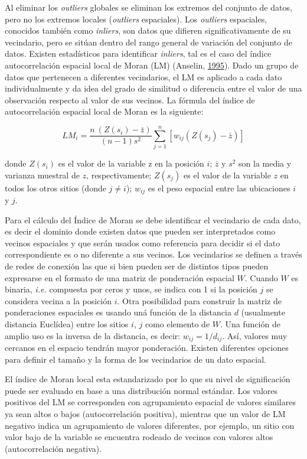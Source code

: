\documentclass[11pt,b5paper,]{krantz}
\begin{document}
Al eliminar los \emph{outliers} globales se eliminan los extremos del
conjunto de datos, pero no los extremos locales (\emph{outliers}
espaciales). Los \emph{outliers} espaciales, conocidos también como
\emph{inliers}, son datos que difieren significativamente de su
vecindario, pero se sitúan dentro del rango general de variación del
conjunto de datos. Existen estadísticos para identificar \emph{inliers},
tal es el caso del índice autocorrelación espacial local de Moran (LM)
(Anselin, \protect\hyperlink{ref-Anselin_1995}{1995}). Dado un grupo de
datos que pertenecen a diferentes vecindarios, el LM es aplicado a cada
dato individualmente y da idea del grado de similitud o diferencia entre
el valor de una observación respecto al valor de sus vecinos. La fórmula
del índice de autocorrelación espacial local de Moran es la siguiente:

\[{LM}_i=\frac{n\ (Z(s_i)-\bar{z})}{(n-1)s^2}\sum_{j=1}^{n}\left[w_{ij}\left(Z(s_j)-\bar{z}\right)\right]\]

donde \(Z(s_i)\) es el valor de la variable z en la posición \(i\);
\(\bar{z}\) y \(s^2\) son la media y varianza muestral de \(z\),
respectivamente; \(Z(s_j)\) es el valor de la variable \(z\) en todos
los otros sitios (donde \(j\neq i\)); \(w_{ij}\) es el peso espacial
entre las ubicaciones \(i\) y \(j\).

Para el cálculo del Índice de Moran se debe identificar el vecindario de
cada dato, es decir el dominio donde existen datos que pueden ser
interpretados como vecinos espaciales y que serán usados como referencia
para decidir si el dato correspondiente es o no diferente a sus vecinos.
Los vecindarios se definen a través de redes de conexión las que si bien
pueden ser de distintos tipos pueden expresarse en el formato de una
matriz de ponderación espacial \(W\). Cuando \(W\) es binaria,
\emph{i.e.} compuesta por ceros y unos, se indica con 1 si la posición
\(j\) se considera vecina a la posición \(i\). Otra posibilidad para
construir la matriz de ponderaciones espaciales es usando uná función de
la distancia \(d\) (usualmente distancia Euclídea) entre los sitios
\(i\), \(j\) como elemento de \(W\). Una función de amplio uso es la
inversa de la distancia, es decir: \(w_{ij}=1/d_{ij}\). Así, valores muy
cercanos en el espacio tendrán mayor ponderación. Existen diferentes
opciones para definir el tamaño y la forma de los vecindarios de un dato
espacial.

El índice de Moran local esta estandarizado por lo que su nivel de
significación puede ser evaluado en base a una distribución normal
estándar. Los valores positivos del LM se corresponden con agrupamiento
espacial de valores similares ya sean altos o bajos (autocorrelación
positiva), mientras que un valor de LM negativo indica un agrupamiento
de valores diferentes, por ejemplo, un sitio con valor bajo de la
variable se encuentra rodeado de vecinos con valores altos
(autocorrelación negativa).
\end{document}

